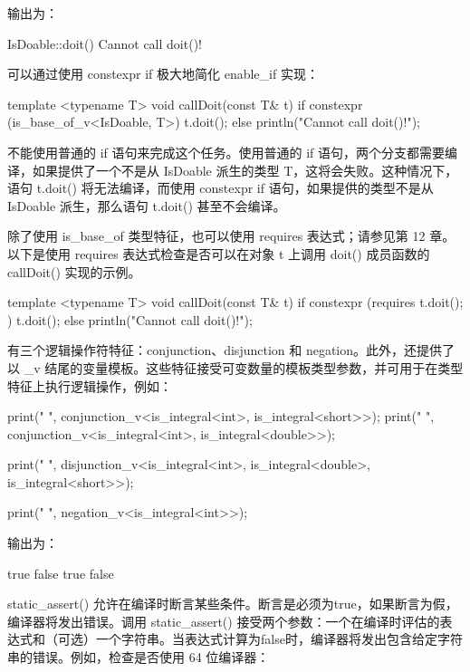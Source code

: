 输出为：

\begin{shell}
IsDoable::doit()
Cannot call doit()!
\end{shell}

可以通过使用 constexpr if 极大地简化 enable\_if 实现：

\begin{cpp}
template <typename T>
void callDoit(const T& t)
{
    if constexpr (is_base_of_v<IsDoable, T>) {
        t.doit();
    } else {
        println("Cannot call doit()!");
    }
}
\end{cpp}

不能使用普通的 if 语句来完成这个任务。使用普通的 if 语句，两个分支都需要编译，如果提供了一个不是从 IsDoable 派生的类型 T，这将会失败。这种情况下，语句 t.doit() 将无法编译，而使用 constexpr if 语句，如果提供的类型不是从 IsDoable 派生，那么语句 t.doit() 甚至不会编译。

除了使用 is\_base\_of 类型特征，也可以使用 requires 表达式；请参见第 12 章。以下是使用 requires 表达式检查是否可以在对象 t 上调用 doit() 成员函数的 callDoit() 实现的示例。

\begin{cpp}
template <typename T>
void callDoit(const T& t)
{
    if constexpr (requires { t.doit(); }) {
        t.doit();
    } else {
        println("Cannot call doit()!");
    }
}
\end{cpp}


有三个逻辑操作符特征：conjunction、disjunction 和 negation。此外，还提供了以 \_v 结尾的变量模板。这些特征接受可变数量的模板类型参数，并可用于在类型特征上执行逻辑操作，例如：

\begin{cpp}
print("{} ", conjunction_v<is_integral<int>, is_integral<short>>);
print("{} ", conjunction_v<is_integral<int>, is_integral<double>>);

print("{} ", disjunction_v<is_integral<int>, is_integral<double>,
                        is_integral<short>>);

print("{} ", negation_v<is_integral<int>>);
\end{cpp}

输出为：

\begin{shell}
true false true false
\end{shell}


static\_assert() 允许在编译时断言某些条件。断言是必须为true，如果断言为假，编译器将发出错误。调用 static\_assert() 接受两个参数：一个在编译时评估的表达式和（可选）一个字符串。当表达式计算为false时，编译器将发出包含给定字符串的错误。例如，检查是否使用 64 位编译器：

